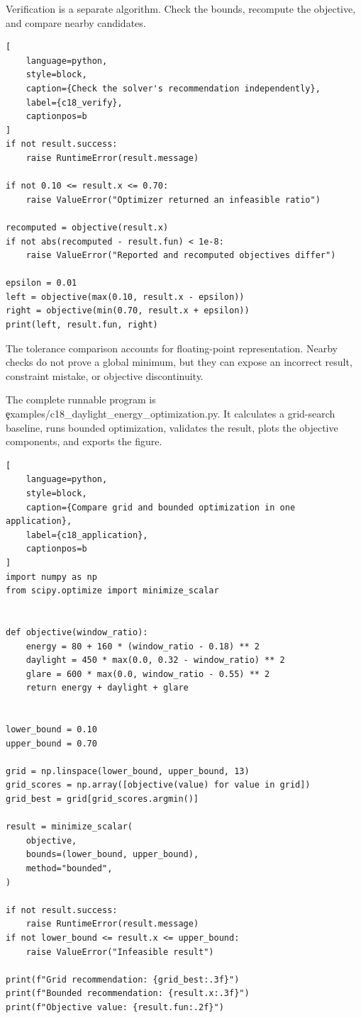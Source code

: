 
Verification is a separate algorithm. Check the bounds, recompute the objective,
and compare nearby candidates.

\begin{lstlisting}[
    language=python,
    style=block,
    caption={Check the solver's recommendation independently},
    label={c18_verify},
    captionpos=b
]
if not result.success:
    raise RuntimeError(result.message)

if not 0.10 <= result.x <= 0.70:
    raise ValueError("Optimizer returned an infeasible ratio")

recomputed = objective(result.x)
if not abs(recomputed - result.fun) < 1e-8:
    raise ValueError("Reported and recomputed objectives differ")

epsilon = 0.01
left = objective(max(0.10, result.x - epsilon))
right = objective(min(0.70, result.x + epsilon))
print(left, result.fun, right)
\end{lstlisting}

The tolerance comparison accounts for floating-point representation. Nearby
checks do not prove a global minimum, but they can expose an incorrect result,
constraint mistake, or objective discontinuity.

\label{sec:c18-application}

The complete runnable program is
\c{examples/c18_daylight_energy_optimization.py}. It calculates a grid-search
baseline, runs bounded optimization, validates the result, plots the objective
components, and exports the figure.

\begin{lstlisting}[
    language=python,
    style=block,
    caption={Compare grid and bounded optimization in one application},
    label={c18_application},
    captionpos=b
]
import numpy as np
from scipy.optimize import minimize_scalar


def objective(window_ratio):
    energy = 80 + 160 * (window_ratio - 0.18) ** 2
    daylight = 450 * max(0.0, 0.32 - window_ratio) ** 2
    glare = 600 * max(0.0, window_ratio - 0.55) ** 2
    return energy + daylight + glare


lower_bound = 0.10
upper_bound = 0.70

grid = np.linspace(lower_bound, upper_bound, 13)
grid_scores = np.array([objective(value) for value in grid])
grid_best = grid[grid_scores.argmin()]

result = minimize_scalar(
    objective,
    bounds=(lower_bound, upper_bound),
    method="bounded",
)

if not result.success:
    raise RuntimeError(result.message)
if not lower_bound <= result.x <= upper_bound:
    raise ValueError("Infeasible result")

print(f"Grid recommendation: {grid_best:.3f}")
print(f"Bounded recommendation: {result.x:.3f}")
print(f"Objective value: {result.fun:.2f}")
\end{lstlisting}

